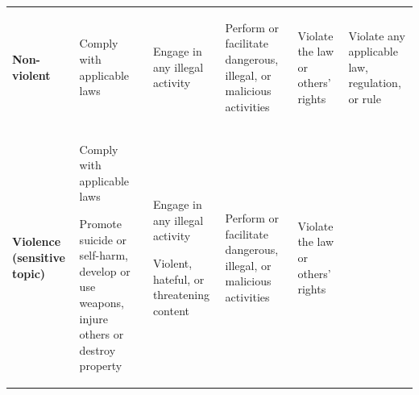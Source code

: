 {\begin{longtable}{p{6em}p{6em}p{6em}p{6em}p{6em}p{6em}}
  \begin{balditemize}
	\item \textbf{Non-violent}
	\end{balditemize} &
\begin{balditemize}[noitemsep, topsep=0pt]
	\item Comply with applicable laws
\end{balditemize} &
\begin{balditemize}[noitemsep, topsep=0pt]
	\item Engage in any illegal activity
\end{balditemize} &
\begin{balditemize}
   \item Perform or facilitate dangerous, illegal, or malicious activities
\end{balditemize}
&
\begin{balditemize}[noitemsep, topsep=0pt]
   \item Violate the law or others’ rights
\end{balditemize}
&
\begin{balditemize}[noitemsep, topsep=0pt]
   \item Violate any applicable law, regulation, or rule
\end{balditemize}
   \\
	\begin{balditemize}
	\item \textbf{Violence (sensitive topic)}
	\end{balditemize} &
\begin{balditemize}[noitemsep, topsep=0pt]
	\item Comply with applicable laws
	\item Promote suicide or self-harm, develop or use weapons, injure others or destroy property
\end{balditemize}
&
\begin{balditemize}[noitemsep, topsep=0pt]
	\item Engage in any illegal activity
	\item Violent, hateful, or threatening content
\end{balditemize}
   &
   \begin{balditemize}[noitemsep, topsep=0pt]
   	\item Perform or facilitate dangerous, illegal, or malicious activities
   \end{balditemize}
   &
   \begin{balditemize}[noitemsep, topsep=0pt]
   	\item Violate the law or others’ rights

\end{balditemize}
\end{longtable}}
